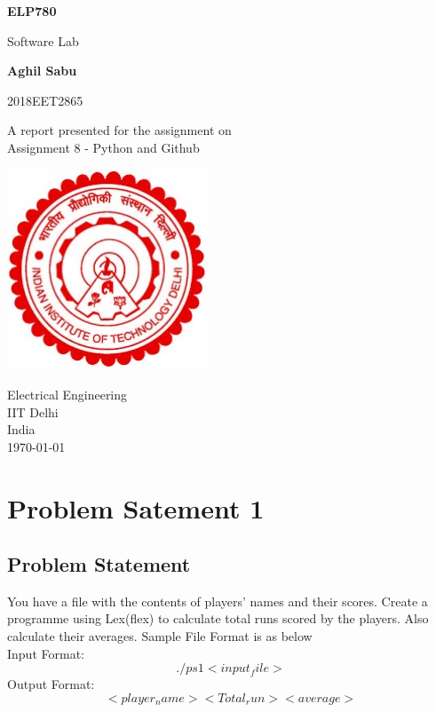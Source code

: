 \documentclass{article}
\begin{document}
    \begin{titlepage}
        \begin{center}
            \vspace*{0cm}
            \Huge
            \textbf{ELP780}
     
            \vspace{0.5cm}
            \LARGE
            Software Lab
     
            \vspace{1.5cm}
            \textbf{Aghil Sabu\\}

            \vspace{.3cm}
            2018EET2865
     
            \vfill
            A report presented for the assignment on\\
            Assignment 8 - Python and Github 
     
            \vspace{0.8cm}
            \includegraphics[width=0.45\textwidth]{./images/logo}
     
            \Large
            Electrical Engineering\\
            IIT Delhi\\
            India\\
            \today
        \end{center}
    \end{titlepage}
    \tableofcontents
    \pagebreak
    
    \section{Problem Satement 1}
    \subsection{Problem Statement}
    You have a file with the contents of players’ names and their scores. Create a programme using
Lex(flex) to calculate total runs scored by the players. Also calculate their averages.
Sample File Format is as below
\\Input Format:
$$./ps1 <input_file>$$
Output Format:
$$<player_name> <Total_run> <average>$$
\end{document}
